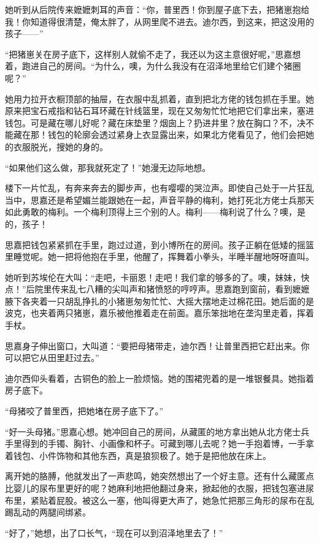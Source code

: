 \par 她听到从后院传来嬷嬷刺耳的声音：“你，普里西！你到屋子底下去，把猪崽抱给我！你知道得很清楚，俺太胖了，从网里爬不进去。迪尔西，到这来，把这没用的孩子——”
\par “把猪崽关在房子底下，这样别人就偷不走了，我还以为这主意很好呢，”思嘉想着，跑进自己的房间。“为什么，噢，为什么我没有在沼泽地里给它们建个猪圈呢？”
\par 她用力拉开衣橱顶部的抽屉，在衣服中乱抓着，直到把北方佬的钱包抓在手里。她原来把宝石戒指和钻石耳环藏在针线篮里，现在又匆匆忙忙地把它们拿出来，塞进钱包。可是藏在哪儿好呢？藏在床垫里？烟囱上？扔进井里？放在胸口？不，决不能藏在那！钱包的轮廓会透过紧身上衣显露出来，如果北方佬看见了，他们会把她的衣服脱光，搜她的身的。
\par “如果他们这么做，那我就死定了！”她漫无边际地想。
\par 楼下一片忙乱，有奔来奔去的脚步声，也有嘤嘤的哭泣声。即使自己处于一片狂乱当中，思嘉还是希望媚兰能跟她在一起，声音平静的梅利，她打死北方佬士兵那天如此勇敢的梅利。一个梅利顶得上三个别的人。梅利——梅利说了什么？噢，是的，孩子！
\par 思嘉把钱包紧紧抓在手里，跑过过道，到小博所在的房间。孩子正躺在低矮的摇篮里睡觉呢。她一把将他抱在手里，他醒了，挥舞着小拳头，半睡半醒地呀呀直叫。
\par 她听到苏埃伦在大叫：“走吧，卡丽恩！走吧！我们拿的够多的了。噢，妹妹，快点！”后院里传来乱七八糟的尖叫声和猪愤怒的哼哼声。思嘉跑到窗前，看到嬷嬷腋下各夹着一只胡乱挣扎的小猪崽匆匆忙忙、大摇大摆地走过棉花田。她后面的是波克，也夹着两只猪崽，嘉乐被他推着走在前面。嘉乐笨拙地在垄沟里走着，挥着手杖。
\par 思嘉身子伸出窗口，大叫道：“要把母猪带走，迪尔西！让普里西把它赶出来。你可以把它从田里赶过去。”
\par 迪尔西仰头看着，古铜色的脸上一脸烦恼。她的围裙兜着的是一堆银餐具。她指着房子底下。
\par “母猪咬了普里西，把她堵在房子底下了。”
\par “好一头母猪。”思嘉心想。她冲回自己的房间，从藏匿的地方拿出她从北方佬士兵手里得到的手镯、胸针、小画像和杯子。可藏到哪儿去呢？她一手抱着博，一手拿着钱包、小件饰物和其他东西，真是狼狈极了。她于是把他放在床上。
\par 离开她的胳膊，他就发出了一声悲鸣，她突然想出了一个好主意。还有什么藏匿点比婴儿的尿布里更好的呢？她麻利地把他翻过身来，掀起他的衣服，把钱包塞进尿布里，紧贴着屁股。被这么一塞，他叫得更大声了，她急忙把那三角形的尿布在乱踢乱动的两腿间绑紧。
\par “好了，”她想，出了口长气，“现在可以到沼泽地里去了！”
